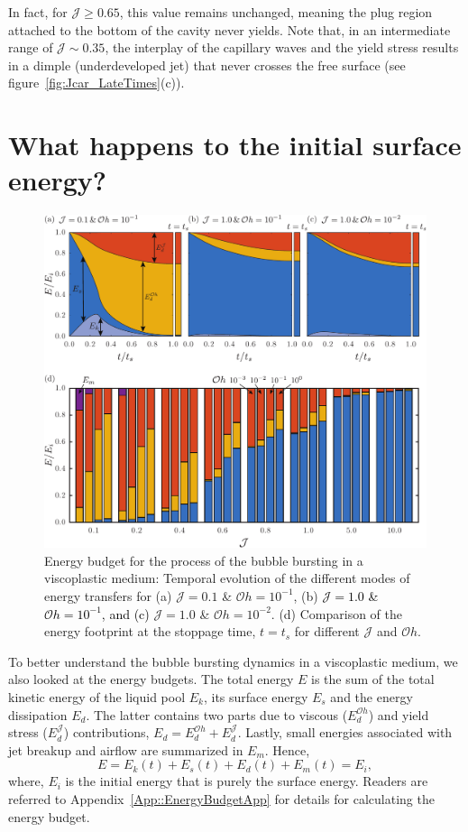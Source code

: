 \documentclass[final]{jfm}
\newcommand*\red{\textcolor{black}}
\begin{document}
In fact, for $\mathcal{J} \ge 0.65$, this value remains unchanged, meaning the plug region attached to the bottom of the cavity never yields. Note that, in an intermediate range of $\mathcal{J} \sim 0.35$, the interplay of the capillary waves and the yield stress results in a dimple (underdeveloped jet) that never crosses the free surface (see figure~\ref{fig:Jcar_LateTimes}(c)). 

\section{What happens to the initial surface energy?}\label{Sec::Energy}
\begin{figure}
	\centerline{\includegraphics[width=\linewidth]{Figure5-EnergyBudgets-eps-converted-to.pdf}}%
	\caption{Energy budget for the process of the bubble bursting in a viscoplastic medium: Temporal evolution of the different modes of energy transfers for (a) $\mathcal{J} =0.1$ \& $\mathcal{O}h =10^{-1}$, (b) \red{$\mathcal{J} = 1.0$ \& $\mathcal{O}h =10^{-1}$, and (c)} $\mathcal{J} =1.0$ \& $\mathcal{O}h =10^{-2}$. (d) Comparison of the energy footprint at the stoppage time, $t = t_s$ for different $\mathcal{J}$ and $\mathcal{O}h$.}
	\label{fig:EnergyBudget}
\end{figure}
To better understand the bubble bursting dynamics in a viscoplastic medium, we also looked at the energy budgets. The total energy $E$ is the sum of the total kinetic energy of the liquid pool $E_k$, its surface energy $E_s$ and the energy dissipation $E_d$. The latter contains two parts due to viscous ($E_d^{\mathcal{O}h}$) and yield stress ($E_d^\mathcal{J}$) contributions, $E_d = E_d^{\mathcal{O}h} +E_d^\mathcal{J}$. Lastly, small energies associated with jet breakup and airflow are summarized in $E_m$. Hence,
\begin{equation}\label{Eqn::ETotal}
E = E_k(t) + E_s(t) + E_d(t) + E_m(t) = E_i,
\end{equation}
where, $E_i$ is the initial energy that is purely the surface energy. Readers are referred to Appendix~\ref{App::EnergyBudgetApp} for details for calculating the energy budget. 
\end{document}

